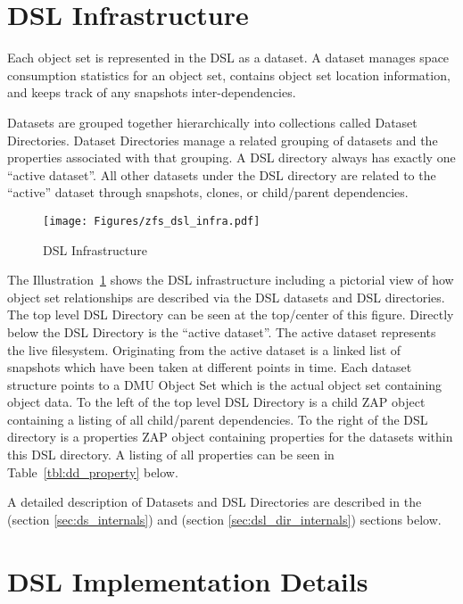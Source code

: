 \section{DSL Infrastructure}

Each object set is represented in the DSL as a dataset.
A dataset manages space consumption statistics for an object set,
contains object set location information,
and keeps track of any snapshots inter-dependencies.

Datasets are grouped together hierarchically into collections called Dataset Directories.
Dataset Directories manage a related grouping of datasets and the properties
associated with that grouping.
A DSL directory always has exactly one “active dataset”.
All other datasets under the DSL directory are related to the “active” dataset
through snapshots, clones, or child/parent dependencies.

\begin{figure}[ht]
  \centering
  \texttt{[image: Figures/zfs\_dsl\_infra.pdf]}
  \caption{DSL Infrastructure}
  \label{fig:dsl_infra}
\end{figure}

The Illustration~\ref{fig:dsl_infra} shows the DSL infrastructure
including a pictorial view of
how object set relationships are described via the DSL datasets and DSL directories.
The top level DSL Directory can be seen at the top/center of this figure.
Directly below the DSL Directory is the “active dataset”.
The active dataset represents the live  filesystem.
Originating from the active dataset is a linked list of snapshots
which have been taken at different points in time.
Each dataset structure points to a DMU Object Set
which is the actual object set containing object data.
To the left of the top level DSL Directory is a child ZAP object
containing a listing of all child/parent dependencies.
To the right of the DSL directory is a properties ZAP object
containing properties for the datasets within this DSL directory.
A listing of all properties can be seen in Table~\ref{tbl:dd_property} below.

A detailed description of Datasets and DSL Directories are described
in the 
(section \ref{sec:ds_internals})
and 
(section \ref{sec:dsl_dir_internals})
sections below.

\section{DSL Implementation Details}\label{sec:dsl_details}


